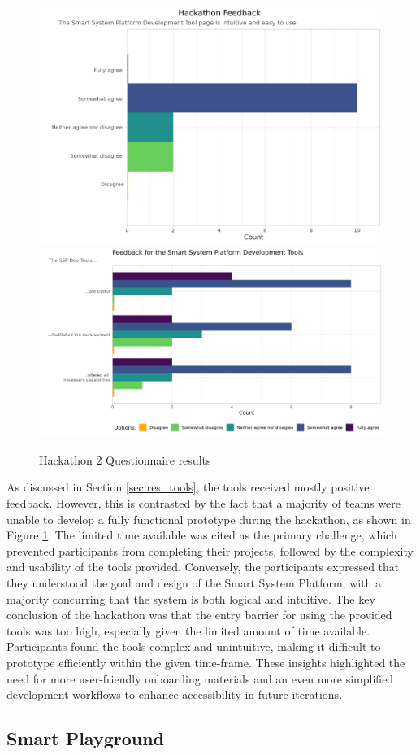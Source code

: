 \begin{figure}[H]
    
    \includegraphics[height=.3\linewidth]{rstudio/survey/plots/toolpage.png}
    \includegraphics[height=.3\linewidth]{rstudio/survey/plots/ssp.png}
    \vspace{\ftspace}
    \caption{Hackathon 2 Questionnaire results}
    \vspace{\ftspace}
    \label{fig:hack2_questions}
\end{figure}

As discussed in Section \ref{sec:res_tools}, the tools received mostly positive feedback. However, this is contrasted by the fact that a majority of teams were unable to develop a fully functional prototype during the hackathon, as shown in Figure \ref{fig:hack2_questions}. The limited time available was cited as the primary challenge, which prevented participants from completing their projects, followed by the complexity and usability of the tools provided. Conversely, the participants expressed that they understood the goal and design of the Smart System Platform, with a majority concurring that the system is both logical and intuitive. The key conclusion of the hackathon was that the entry barrier for using the provided tools was too high, especially given the limited amount of time available. Participants found the tools complex and unintuitive, making it difficult to prototype efficiently within the given time-frame. These insights highlighted the need for more user-friendly onboarding materials and an even more simplified development workflows to enhance accessibility in future iterations.

\subsection{\label{sec:res_smartplayground}\label{sec:res_honourablementions}Smart Playground}

